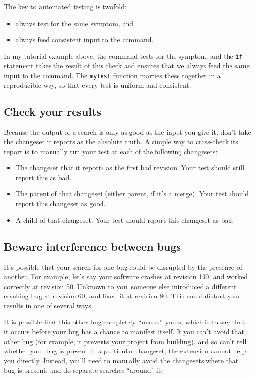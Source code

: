 The key to automated testing is twofold:
\begin{itemize}
\item always test for the same symptom, and
\item always feed consistent input to the  command.
\end{itemize}
In my tutorial example above, the  command tests for the
symptom, and the \texttt{if} statement takes the result of this check
and ensures that we always feed the same input to the 
command.  The \texttt{mytest} function marries these together in a
reproducible way, so that every test is uniform and consistent.

\subsection{Check your results}

Because the output of a  search is only as good as the
input you give it, don't take the changeset it reports as the
absolute truth.  A simple way to cross-check its report is to manually
run your test at each of the following changesets:
\begin{itemize}
\item The changeset that it reports as the first bad revision.  Your
  test should still report this as bad.
\item The parent of that changeset (either parent, if it's a merge).
  Your test should report this changeset as good.
\item A child of that changeset.  Your test should report this
  changeset as bad.
\end{itemize}

\subsection{Beware interference between bugs}

It's possible that your search for one bug could be disrupted by the
presence of another.  For example, let's say your software crashes at
revision 100, and worked correctly at revision 50.  Unknown to you,
someone else introduced a different crashing bug at revision 60, and
fixed it at revision 80.  This could distort your results in one of
several ways.

It is possible that this other bug completely ``masks'' yours, which
is to say that it occurs before your bug has a chance to manifest
itself.  If you can't avoid that other bug (for example, it prevents
your project from building), and so can't tell whether your bug is
present in a particular changeset, the  extension cannot
help you directly.  Instead, you'll need to manually avoid the
changesets where that bug is present, and do separate searches
``around'' it.

